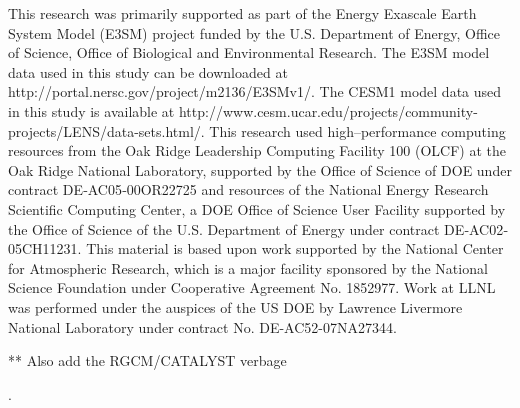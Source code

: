 \documentclass[draft,ms]{AGUTeX}
\begin{document}
\begin{article}
\begin{acknowledgments}
This research was primarily supported as part of the Energy Exascale Earth System Model (E3SM) project funded by the U.S. Department of Energy, Office of Science, Office of Biological and Environmental Research. The E3SM model data used in this study can be downloaded at http://portal.nersc.gov/project/m2136/E3SMv1/. The CESM1 model data used in this study is available at http://www.cesm.ucar.edu/projects/community-projects/LENS/data-sets.html/.  This research used high--performance computing resources from the Oak Ridge Leadership Computing Facility 100 (OLCF) at the Oak Ridge National Laboratory, supported by the Office of Science of DOE under contract DE‐AC05‐00OR22725 and resources of the National Energy Research Scientific Computing Center, a DOE Office of Science User Facility supported by the Office of Science of the U.S. Department of Energy under contract DE‐AC02‐05CH11231. This material is based upon work supported by the National Center for Atmospheric Research, which is a major facility sponsored by the National Science Foundation under Cooperative Agreement No. 1852977. Work at LLNL was performed under the auspices of the US DOE by Lawrence Livermore National Laboratory under contract No. DE-AC52-07NA27344. 

** Also add the RGCM/CATALYST verbage

\end{acknowledgments}



%
%
%
%
%

.







\end{article}
\end{document}
